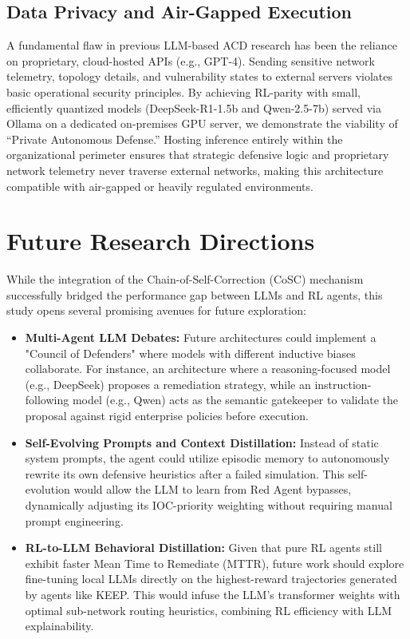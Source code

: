 \documentclass[letterpaper, 10 pt, conference]{ieeeconf}
\begin{document}
\subsection{Data Privacy and Air-Gapped Execution}
A fundamental flaw in previous LLM-based ACD research has been the reliance on proprietary, cloud-hosted APIs (e.g., GPT-4). Sending sensitive network telemetry, topology details, and vulnerability states to external servers violates basic operational security principles. By achieving RL-parity with small, efficiently quantized models (DeepSeek-R1-1.5b and Qwen-2.5-7b) served via Ollama on a dedicated on-premises GPU server, we demonstrate the viability of ``Private Autonomous Defense.'' Hosting inference entirely within the organizational perimeter ensures that strategic defensive logic and proprietary network telemetry never traverse external networks, making this architecture compatible with air-gapped or heavily regulated environments.

\section{Future Research Directions}
While the integration of the Chain-of-Self-Correction (CoSC) mechanism successfully bridged the performance gap between LLMs and RL agents, this study opens several promising avenues for future exploration:

\begin{itemize}
    \item \textbf{Multi-Agent LLM Debates:} Future architectures could implement a "Council of Defenders" where models with different inductive biases collaborate. For instance, an architecture where a reasoning-focused model (e.g., DeepSeek) proposes a remediation strategy, while an instruction-following model (e.g., Qwen) acts as the semantic gatekeeper to validate the proposal against rigid enterprise policies before execution.
    
    \item \textbf{Self-Evolving Prompts and Context Distillation:} Instead of static system prompts, the agent could utilize episodic memory to autonomously rewrite its own defensive heuristics after a failed simulation. This self-evolution would allow the LLM to learn from Red Agent bypasses, dynamically adjusting its IOC-priority weighting without requiring manual prompt engineering.
    
    \item \textbf{RL-to-LLM Behavioral Distillation:} Given that pure RL agents still exhibit faster Mean Time to Remediate (MTTR), future work should explore fine-tuning local LLMs directly on the highest-reward trajectories generated by agents like KEEP. This would infuse the LLM's transformer weights with optimal sub-network routing heuristics, combining RL efficiency with LLM explainability.
\end{itemize}


\nocite{Framework,Analysis,Detection,Efficient,Hybrid,MalJPEG,Method,Prevention,StegomalwareA,Stegomalware} %


\end{document}
